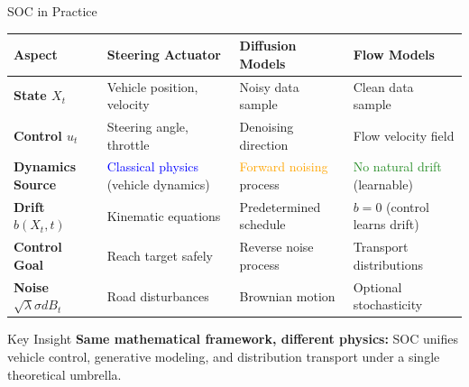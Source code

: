 \documentclass[aspectratio=169,xcolor=dvipsnames]{beamer}
\begin{document}
\begin{frame}{SOC in Practice}

    \vspace{-0.3cm}
    \begin{table}
        \centering
        \small
        \begin{tabular}{>{\centering\arraybackslash}p{}|>{\centering\arraybackslash}p{}|>{\centering\arraybackslash}p{}|>{\centering\arraybackslash}p{}}
            \toprule
            \textbf{Aspect} & \textbf{Steering Actuator} & \textbf{Diffusion Models} & \textbf{Flow Models} \\
            \midrule
            \textbf{State $X_t$} & Vehicle position, velocity & Noisy data sample & Clean data sample \\
            \midrule
            \textbf{Control $u_t$} & Steering angle, throttle & Denoising direction & Flow velocity field \\
            \midrule
            \textbf{Dynamics Source} & \textcolor{blue}{Classical physics} (vehicle dynamics) & \textcolor{orange}{Forward noising} process & \textcolor{ForestGreen}{No natural drift} (learnable) \\
            \midrule
            \textbf{Drift $b(X_t,t)$} & Kinematic equations & Predetermined schedule & $b = 0$ (control learns drift) \\
            \midrule
            \textbf{Control Goal} & Reach target safely & Reverse noise process & Transport distributions \\
            \midrule
            \textbf{Noise $\sqrt{\lambda}\sigma dB_t$} & Road disturbances & Brownian motion & Optional stochasticity \\
            \bottomrule
        \end{tabular}
    \end{table}
    
    \vspace{0.3cm}
    
    \begin{alertblock}{Key Insight}
        \textbf{Same mathematical framework, different physics:} SOC unifies vehicle control, generative modeling, and distribution transport under a single theoretical umbrella.
    \end{alertblock}

\end{frame}
\end{document}
